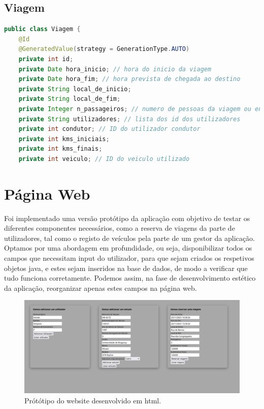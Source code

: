 \documentclass[11pt,a4paper]{report}%
\begin{document}
\subsection{Viagem}

\begin{lstlisting}[language=Java, caption=Classe Viagem]
public class Viagem {
    @Id
    @GeneratedValue(strategy = GenerationType.AUTO)
    private int id;
    private Date hora_inicio; // hora do inicio da viagem
    private Date hora_fim; // hora prevista de chegada ao destino
    private String local_de_inicio;
    private String local_de_fim;
    private Integer n_passageiros; // numero de pessoas da viagem ou então uma lista com as pessoas
    private String utilizadores; // lista dos id dos utilizadores
    private int condutor; // ID do utilizador condutor
    private int kms_iniciais;
    private int kms_finais;
    private int veiculo; // ID do veiculo utilizado

\end{lstlisting}

\newpage
\section{Página Web}


Foi implementado uma versão protótipo da aplicação com objetivo de testar os diferentes componentes necessários, como a reserva de viagens da parte de utilizadores, tal como o registo de veículos pela parte de um gestor da aplicação. Optamos por uma abordagem em profundidade, ou seja, disponibilizar todos os campos que necessitam input do utilizador, para que sejam criados os respetivos objetos java, e estes sejam inseridos na base de dados, de modo a  verificar que tudo funciona corretamente. Podemos assim, na fase de desenvolvimento estético da aplicação, reorganizar apenas estes campos na página web.

\begin{figure}[h!]
\includegraphics[scale=0.35]{Pictures/localhost.png}
\caption{\label{fig:html} Prótótipo do website desenvolvido em html.}
\end{figure}
\end{document}

